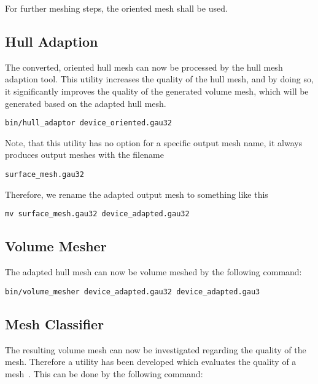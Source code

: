 For further meshing steps, the oriented mesh shall be used.

\newpage

\subsection{Hull Adaption}
The converted, oriented hull mesh can now be processed by the hull mesh adaption 
tool. This utility increases the quality of the hull mesh, and by doing so, 
it significantly improves the quality of the generated volume mesh, which will 
be generated based on the adapted hull mesh.

\begin{exaipd}
\begin{Verbatim}
bin/hull_adaptor device_oriented.gau32
\end{Verbatim}
\end{exaipd}

Note, that this utility has no option for a specific output mesh name, it 
always produces output meshes with the filename

\begin{exaipd}
\begin{Verbatim}
surface_mesh.gau32
\end{Verbatim}
\end{exaipd}

Therefore, we rename the adapted output mesh to something like this

\begin{exaipd}
\begin{Verbatim}
mv surface_mesh.gau32 device_adapted.gau32
\end{Verbatim}
\end{exaipd}

\subsection{Volume Mesher}
The adapted hull mesh can now be volume meshed by the following command:

\begin{exaipd}
\begin{Verbatim}
bin/volume_mesher device_adapted.gau32 device_adapted.gau3
\end{Verbatim}
\end{exaipd}

\subsection{Mesh Classifier}
The resulting volume mesh can now be investigated regarding the quality 
of the mesh. Therefore a utility has been developed which evaluates 
the quality of a mesh~\cite{heinzlgen}. 
This can be done by the following command:

